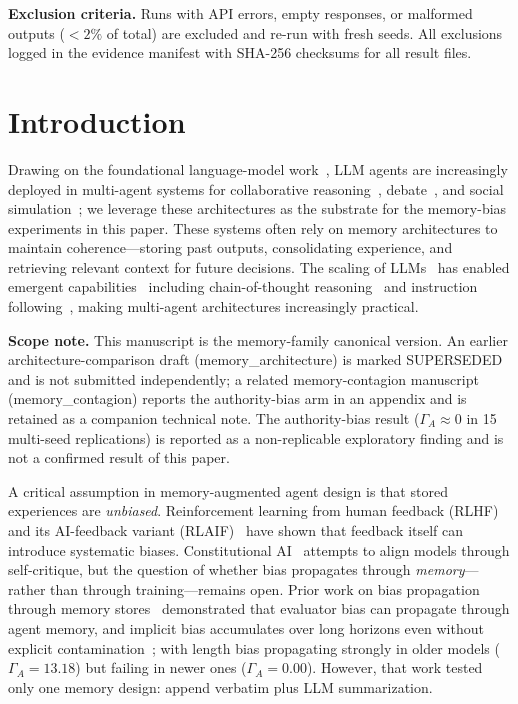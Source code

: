 \documentclass[11pt]{article}
\begin{document}
\textbf{Exclusion criteria.} Runs with API errors, empty responses, or malformed outputs ($<2\%$ of total) are excluded and re-run with fresh seeds. All exclusions logged in the evidence manifest with SHA-256 checksums for all result files.

\section{Introduction}
\label{sec:intro}

Drawing on the foundational language-model work~\cite{brown2020language,touvron2023llama,zhao2023survey}, LLM agents are increasingly deployed in multi-agent systems for collaborative reasoning~\cite{du2024improving}, debate~\cite{li2023camel,liang2023multiagent}, and social simulation~\cite{park2023generative}; we leverage these architectures as the substrate for the memory-bias experiments in this paper. These systems often rely on memory architectures to maintain coherence---storing past outputs, consolidating experience, and retrieving relevant context for future decisions. The scaling of LLMs~\cite{kaplan2020scaling} has enabled emergent capabilities~\cite{wei2022emergent} including chain-of-thought reasoning~\cite{wei2022chain} and instruction following~\cite{ouyang2022training}, making multi-agent architectures increasingly practical.

\textbf{Scope note.} This manuscript is the memory-family canonical version. An earlier architecture-comparison draft (memory\_architecture) is marked SUPERSEDED and is not submitted independently; a related memory-contagion manuscript (memory\_contagion) reports the authority-bias arm in an appendix and is retained as a companion technical note. The authority-bias result ($\Gamma_A \approx 0$ in 15 multi-seed replications) is reported as a non-replicable exploratory finding and is not a confirmed result of this paper.

A critical assumption in memory-augmented agent design is that stored experiences are \emph{unbiased}. Reinforcement learning from human feedback (RLHF)~\cite{christiano2017deep,ouyang2022training} and its AI-feedback variant (RLAIF)~\cite{lee2023rlaif} have shown that feedback itself can introduce systematic biases. Constitutional AI~\cite{bai2022constitutional} attempts to align models through self-critique, but the question of whether bias propagates through \emph{memory}---rather than through training---remains open. Prior work on bias propagation through memory stores~\cite{bertalanic2026cost,huang2026cagecal,ma2026implicitbias} demonstrated that evaluator bias can propagate through agent memory, and implicit bias accumulates over long horizons even without explicit contamination~\cite{ma2026implicitbias}; with length bias propagating strongly in older models ($\Gamma_A = 13.18$) but failing in newer ones ($\Gamma_A = 0.00$). However, that work tested only one memory design: append verbatim plus LLM summarization.
\end{document}
